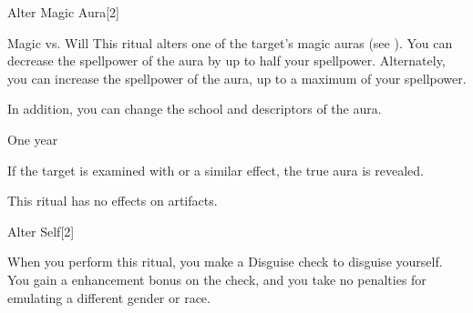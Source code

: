 \begin{spellsection}{Alter Magic Aura}[2]
    \begin{spellheader}
    \end{spellheader}
    \begin{spellcontent}
        \begin{spelltargetinginfo}
        \end{spelltargetinginfo}
        \begin{spelleffects}
            \begin{spellattack}{Magic vs. Will}
                \spellsuccess This ritual alters one of the target's magic auras (see ). You can decrease the spellpower of the aura by up to half your spellpower. Alternately, you can increase the spellpower of the aura, up to a maximum of your spellpower.

                In addition, you can change the school and descriptors of the aura.
            \end{spellattack}
            \spelldur One year \dismissable
        \end{spelleffects}
    \end{spellcontent}
    \begin{spellfooter}
        \spellnotes If the target is examined with  or a similar effect, the true aura is revealed.

        \par This ritual has no effects on artifacts.
    \end{spellfooter}
\end{spellsection}

\begin{spellsection}{Alter Self}[2]
    \begin{spellheader}
    \end{spellheader}
    \begin{spellcontent}
        \begin{spelltargetinginfo}
        \end{spelltargetinginfo}
        \begin{spelleffects}

            \spelleffect When you perform this ritual, you make a Disguise check to disguise yourself. You gain a  enhancement bonus on the check, and you take no penalties for emulating a different gender or race.
            \spelldur \durlong
        \end{spelleffects}
    \end{spellcontent}
    \begin{spellfooter}
    \end{spellfooter}
\end{spellsection}

